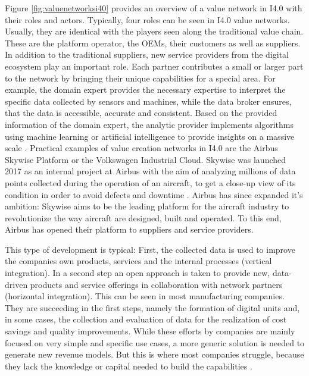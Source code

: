 Figure \ref{fig:valuenetworksi40} provides an overview of a value network in \ac{I4.0} with their roles and actors. Typically, four roles can be seen in \ac{I4.0} value networks. Usually, they are identical with the players seen along the traditional value chain. These are the platform operator, the OEMs, their customers as well as suppliers. In addition to the traditional suppliers, new service providers from the digital ecosystem play an important role. Each partner contributes a small or larger part to the network by bringing their unique capabilities for a special area. For example, the domain expert provides the necessary expertise to interpret the specific data collected by sensors and machines, while the data broker ensures, that the data is accessible, accurate and consistent. Based on the provided information of the domain expert, the analytic provider implements algorithms using machine learning or artificial intelligence to provide insights on a massive scale \cite{Russo2018HowCompetition}. Practical examples of value creation networks in \ac{I4.0} are the Airbus Skywise Platform or the Volkswagen Industrial Cloud. Skywise was launched 2017 as an internal project at Airbus with the aim of analyzing millions of data points collected during the operation of an aircraft, to get a close-up view of its condition in order to avoid defects and downtime \cite{Hanke2019AirbusWerden}. Airbus has since expanded it's ambition: Skywise aims to be the leading platform for the aircraft industry to revolutionize the way aircraft are designed, built and operated. To this end, Airbus has opened their platform to suppliers and service providers. 

This type of development is typical: First, the collected data is used to improve the companies own products, services and the internal processes (vertical integration). In a second step an open approach is taken to provide new, data-driven products and service offerings in collaboration with network partners (horizontal integration). This can be seen in most manufacturing companies. They are succeeding in the first steps, namely the formation of digital units and, in some cases, the collection and evaluation of data for the realization of cost savings and quality improvements. While these efforts by companies are mainly focused on very simple and specific use cases, a more generic solution is needed to generate new revenue models. But this is where most companies struggle, because they lack the knowledge or capital needed to build the capabilities \cite[p. 19]{Arnold2018DigitaleMittelstand}.

